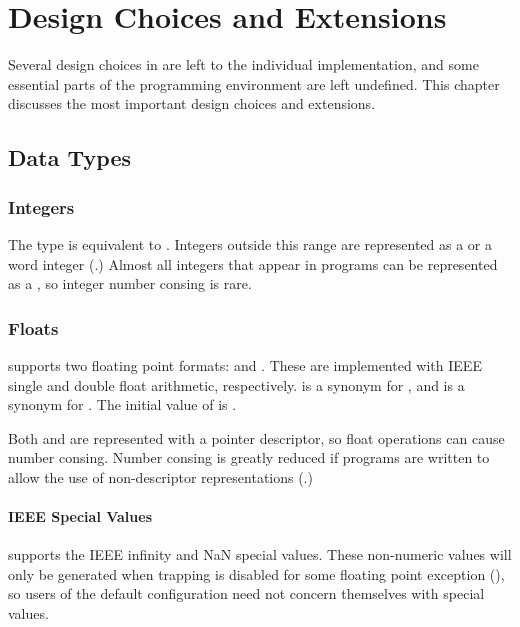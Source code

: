 \chapter{Design Choices and Extensions}

Several design choices in \clisp{} are left to the individual
implementation, and some essential parts of the programming environment
are left undefined.  This chapter discusses the most important design
choices and extensions.

\section{Data Types}

\subsection{Integers}

The  type is equivalent to .
Integers outside this range are represented as a  or
a word integer (.)  Almost all integers that
appear in programs can be represented as a , so integer
number consing is rare.


\subsection{Floats}
\label{ieee-float}

\cmucl{} supports two floating point formats: 
and .  These are implemented with IEEE single
and double float arithmetic, respectively.   is a
synonym for , and  is a synonym
for .  The initial value of
 is .

Both  and  are represented with
a pointer descriptor, so float operations can cause number consing.
Number consing is greatly reduced if programs are written to allow the
use of non-descriptor representations (.)


\subsubsection{IEEE Special Values}

\cmucl{} supports the IEEE infinity and NaN special values.  These
non-numeric values will only be generated when trapping is disabled
for some floating point exception (), so users of
the default configuration need not concern themselves with special
values.

